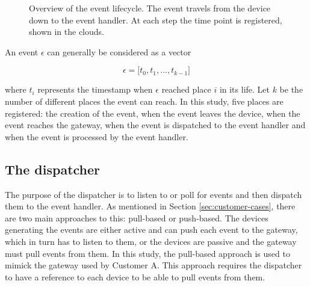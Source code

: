 \begin{figure}[h!]
    \centering

    \caption[Over of the event lifecycle.]{Overview of the event lifecycle. The
    event travels from the device down to the event handler. At each step the
    time point is registered, shown in the clouds.}

    \label{fig:event-life}
\end{figure}

An event $\epsilon$ can generally be considered as a vector

$$
\epsilon = \big[ t_0, t_1, ..., t_{k-1} \big]
$$

where $t_i$ represents the timestamp when $\epsilon$ reached place $i$ in its
life. Let $k$ be the number of different places the event can reach. In this
study, five places are registered: the creation of the event, when the event
leaves the device, when the event reaches the gateway, when the event is
dispatched to the event handler and when the event is processed by the event
handler.

\subsection{The dispatcher}

The purpose of the dispatcher is to listen to or poll for events and then
dispatch them to the event handler. As mentioned in Section
\ref{sec:customer-cases}, there are two main approaches to this: pull-based or
push-based. The devices generating the events are either active and can push
each event to the gateway, which in turn has to listen to them, or the devices
are passive and the gateway must pull events from them. In this study, the
pull-based approach is used to mimick the gateway used by Customer A. This
approach requires the dispatcher to have a reference to each device to be able
to pull events from them.

